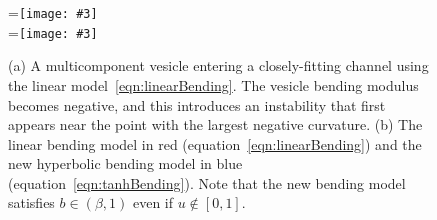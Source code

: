 \documentclass[twoside,twocolumn,9pt]{article}
\newcommand{\subfigimg}[3][,]{%
  \setbox1=\hbox{\texttt{[image: \#3]}}%
  \leavevmode\rlap{\usebox1}%
  \rlap{\hspace*{0pt}\raisebox{\dimexpr\ht1-0\baselineskip}{\bf
  \normalsize #2}}%
  \phantom{\usebox1}%
}
\begin{document}
\begin{figure}[H]
  \centering
  \subfigimg[width=0.9\linewidth, clip ]{(a)}{figures/OldBending.pdf} \\
  \subfigimg[width=0.9\linewidth, clip ]{(b)}{figures/concModels.pdf}
  \caption{\label{fig:concModels} \small (a) A multicomponent vesicle
  entering a closely-fitting channel using the linear
  model~\eqref{eqn:linearBending}. The vesicle bending modulus becomes
  negative, and this introduces an instability that first appears near
  the point with the largest negative curvature. (b) The linear bending
  model in red (equation~\eqref{eqn:linearBending}) and the new
  hyperbolic bending model in blue (equation~\eqref{eqn:tanhBending}).
  Note that the new bending model satisfies $b \in (\beta,1)$ even if $u
  \notin [0,1]$.}
\end{figure}





\end{document}
